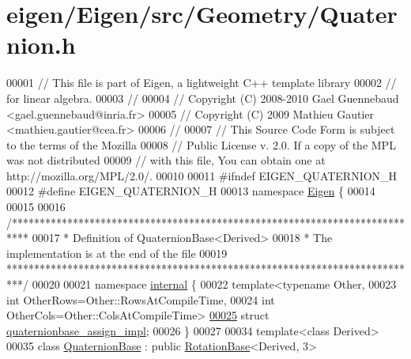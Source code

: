 \hypertarget{eigen_2_eigen_2src_2_geometry_2_quaternion_8h_source}{}\section{eigen/\+Eigen/src/\+Geometry/\+Quaternion.h}
\label{eigen_2_eigen_2src_2_geometry_2_quaternion_8h_source}

\begin{DoxyCode}
00001 \textcolor{comment}{// This file is part of Eigen, a lightweight C++ template library}
00002 \textcolor{comment}{// for linear algebra.}
00003 \textcolor{comment}{//}
00004 \textcolor{comment}{// Copyright (C) 2008-2010 Gael Guennebaud <gael.guennebaud@inria.fr>}
00005 \textcolor{comment}{// Copyright (C) 2009 Mathieu Gautier <mathieu.gautier@cea.fr>}
00006 \textcolor{comment}{//}
00007 \textcolor{comment}{// This Source Code Form is subject to the terms of the Mozilla}
00008 \textcolor{comment}{// Public License v. 2.0. If a copy of the MPL was not distributed}
00009 \textcolor{comment}{// with this file, You can obtain one at http://mozilla.org/MPL/2.0/.}
00010 
00011 \textcolor{preprocessor}{#ifndef EIGEN\_QUATERNION\_H}
00012 \textcolor{preprocessor}{#define EIGEN\_QUATERNION\_H}
00013 \textcolor{keyword}{namespace }\hyperlink{namespace_eigen}{Eigen} \{ 
00014 
00015 
00016 \textcolor{comment}{/***************************************************************************}
00017 \textcolor{comment}{* Definition of QuaternionBase<Derived>}
00018 \textcolor{comment}{* The implementation is at the end of the file}
00019 \textcolor{comment}{***************************************************************************/}
00020 
00021 \textcolor{keyword}{namespace }\hyperlink{namespaceinternal}{internal} \{
00022 \textcolor{keyword}{template}<\textcolor{keyword}{typename} Other,
00023          \textcolor{keywordtype}{int} OtherRows=Other::RowsAtCompileTime,
00024          \textcolor{keywordtype}{int} OtherCols=Other::ColsAtCompileTime>
\hyperlink{struct_eigen_1_1internal_1_1quaternionbase__assign__impl}{00025} \textcolor{keyword}{struct }\hyperlink{struct_eigen_1_1internal_1_1quaternionbase__assign__impl}{quaternionbase\_assign\_impl};
00026 \}
00027 
00034 \textcolor{keyword}{template}<\textcolor{keyword}{class} Derived>
00035 \textcolor{keyword}{class }\hyperlink{group___geometry___module_class_eigen_1_1_quaternion_base}{QuaternionBase} : \textcolor{keyword}{public} \hyperlink{class_eigen_1_1_rotation_base}{RotationBase}<Derived, 3>

\end{DoxyCode}
